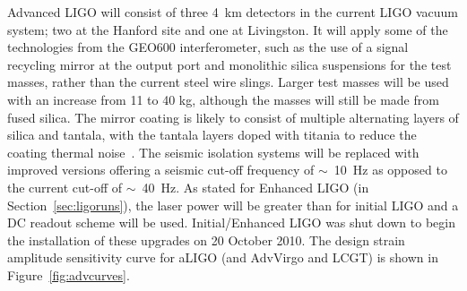 \documentclass{article}
\begin{document}
Advanced LIGO will consist of three 4~km detectors in the current LIGO vacuum
system; two at the Hanford site and one at
Livingston. It will apply some of the technologies from the GEO600
interferometer, such as the use of a signal recycling mirror at the output port
and monolithic silica suspensions for the test masses, rather than the current
steel wire slings. Larger test masses will be used with an increase from 11 to
40 kg, although the masses will still be made from fused silica. The mirror
coating is likely to consist of multiple alternating layers of silica and
tantala, with the tantala layers doped with titania to reduce the coating
thermal noise~\cite{Agresti:2006}. The seismic isolation systems will be
replaced with improved versions offering a seismic cut-off frequency
of $\sim$~10~Hz as opposed to the current cut-off of $\sim$~40~Hz. As
stated for Enhanced LIGO (in Section~\ref{sec:ligoruns}), the laser
power will be greater than for initial LIGO and a DC readout scheme
will be used. Initial/Enhanced LIGO was shut down to begin the
installation of these upgrades on 20 October 2010. The design strain
amplitude sensitivity curve for aLIGO (and AdvVirgo and LCGT) is shown
in Figure~\ref{fig:advcurves}.
\end{document}
